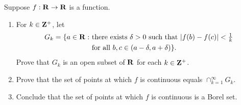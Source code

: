 \begin{exercise}
    Suppose $f : \mathbf{R} \to \mathbf{R}$ is a function.
    \begin{enumerate}[label = (\alph*)]
        \item For $k \in \mathbf{Z}^+$, let
        \begin{align*}
            G_k = \{a \in \mathbf{R} : &\text{ there exists } \delta > 0 \text{ such that } |f(b) - f(c)| < \tfrac{1}{k} \\ & \text{ for all } b,c \in (a - \delta, a + \delta) \}.
        \end{align*}
        Prove that $G_k$ is an open subset of $\mathbf{R}$ for each $k \in \mathbf{Z}^+$.
        \item Prove that the set of points at which $f$ is continuous equals $\cap_{k=1}^{\infty}G_k$.
        \item Conclude that the set of points at which $f$ is continuous is a Borel set.\\
    \end{enumerate}
\end{exercise}

